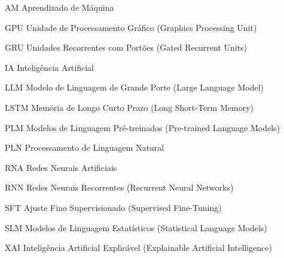 \begin{simbolos}
    \label{sec:lista_simbolos} %
    \item[AM] Aprendizado de Máquina
    \item[GPU] Unidade de Processamento Gráfico (Graphics Processing Unit)
    \item[GRU] Unidades Recorrentes com Portões (Gated Recurrent Units)
    \item[IA] Inteligência Artificial
    \item[LLM] Modelo de Linguagem de Grande Porte (Large Language Model)
    \item[LSTM] Memória de Longo Curto Prazo (Long Short-Term Memory)
    \item[PLM] Modelos de Linguagem Pré-treinados (Pre-trained Language Models)
    \item[PLN] Processamento de Linguagem Natural
    \item[RNA] Redes Neurais Artificiais
    \item[RNN] Redes Neurais Recorrentes (Recurrent Neural Networks)
    \item[SFT] Ajuste Fino Supervisionado (Supervised Fine-Tuning)
    \item[SLM] Modelos de Linguagem Estatísticos (Statistical Language Models)
    \item[XAI] Inteligência Artificial Explicável (Explainable Artificial Intelligence)
\end{simbolos}
